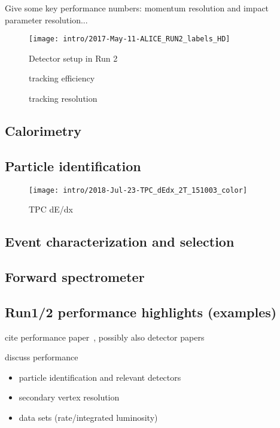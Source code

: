 Give some key performance numbers: momentum resolution and impact parameter resolution...

\begin{figure}
\centering
\texttt{[image: intro/2017-May-11-ALICE\_RUN2\_labels\_HD]}
\caption{Detector setup in Run 2}
\label{fig:alice_run2}
\end{figure}

\begin{figure}
\centering
\caption{tracking efficiency}
\label{fig:trk_eff}
\end{figure}

\begin{figure}
\centering
\caption{tracking \pt resolution}
\label{fig:trk_res}
\end{figure}

\subsection{Calorimetry}

\subsection{Particle identification}

\begin{figure}
\centering
\texttt{[image: intro/2018-Jul-23-TPC\_dEdx\_2T\_151003\_color]}
\caption{TPC dE/dx}
\label{fig:tpc_dedx}
\end{figure}

\subsection{Event characterization and selection}

\subsection{Forward spectrometer}

\subsection*{Run1/2 performance highlights (examples)}

cite performance paper~\cite{Abelev:2014ffa}, possibly also detector papers

discuss performance
\begin{itemize}
\item particle identification and relevant detectors
\item secondary vertex resolution
\item data sets (rate/integrated luminosity)
\end{itemize}

